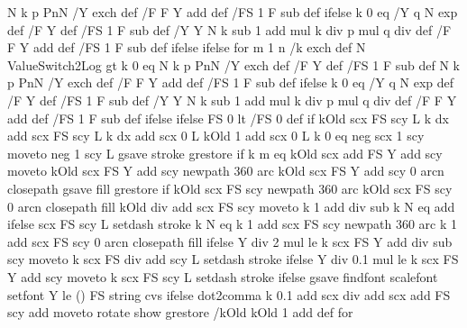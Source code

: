 {{{{       { N k p PnN /Y exch def /F F Y add def /FS 1 F sub def }
      ifelse }
         { k 0 eq
           { /Y q N exp def /F Y def /FS 1 F sub def }
           { /Y Y N k sub 1 add mul k div p mul q div def
             /F F Y add def /FS 1 F sub def }
         ifelse } ifelse
      } for
      m 1 n {             %
        /k exch def       %
        N ValueSwitch2Log gt { k 0 eq
          { N k p PnN /Y exch def /F Y def /FS 1 F sub def }
          { N k p PnN /Y exch def /F F Y add def /FS 1 F sub def } ifelse }
        {  k 0 eq
          { /Y q N exp def  /F Y def /FS 1 F sub def }
          { /Y Y N k sub 1 add mul k div p mul q div def
            /F F Y add def /FS 1 F sub def }
        ifelse
      } ifelse  %
      FS 0 lt { /FS 0 def } if
      \ifPst@markZeros kOld scx FS scy L k dx add scx FS scy L k dx add scx 0 L kOld 1 add scx 0 L
      \else
      \ifPst@LineEnding
      k 0 eq
        { \psFunc@leftEnd neg scx 1 scy moveto \psFunc@radiusout neg 1 scy L gsave \pst@usecolor\pslinecolor stroke grestore } if
      k m eq {kOld scx \psFunc@radiusout add FS Y add scy moveto  kOld scx FS Y add scy  newpath  360 arc kOld scx FS Y add scy  0 arcn closepath
      gsave \pst@usecolor\psk@LineEndColorR fill grestore } if
        kOld scx FS scy newpath  360 arc kOld scx FS scy  0 arcn closepath \pst@usecolor\psk@LineEndColorL fill %
       \fi
      kOld \ifPst@LineEnding\psFunc@radiusout\pst@number\psxunit div add \fi
      scx FS scy moveto
      k 1 add
      \ifPst@LineEnding\psFunc@radiusout\pst@number\psxunit div sub \fi
       k N eq
      { \psFunc@rightEnd add }
      { } ifelse
      scx FS scy L \pst@usecolor{} setdash stroke
      \ifPst@LineEnding
      k N eq
      { }
      { k 1 add scx FS scy newpath  360 arc k 1 add scx FS scy  0 arcn closepath \pst@usecolor\psk@LineEndColorR fill }
      ifelse
        \ifPst@VLines
        Y \psFunc@radiusout\pst@number\psyunit div 2 mul le
        { }
        {  k scx FS Y add \psFunc@radiusout\pst@number\psyunit div sub scy moveto k scx FS \psFunc@radiusout\pst@number\psyunit div add scy L \pst@usecolor{} setdash stroke } ifelse \fi
      \else
      \ifPst@VLines
      Y \psFunc@radiusout\pst@number\psyunit div 0.1 mul le
      { }
      { k scx FS Y add scy moveto k scx FS scy L \pst@usecolor{} setdash stroke } ifelse
     \fi\fi\fi
      \ifPst@printValue
        gsave \psk@PSfont\space findfont \psk@fontscale scalefont setfont \pst@usecolor\psk@LabelColor %
        Y \psFunc@PrintVLimit le { () } { FS \psk@valuewidth\space string cvs } ifelse
         \ifPst@comma dot2comma \fi
        k 0.1 add scx  div add \psFunc@xlabelsep scx add
        FS  scy \pst@number\pslabelsep add moveto
        \psFunc@langle rotate show grestore
      \fi
      /kOld kOld 1 add def
    } for
  }%
  \end@OpenObj
}%
